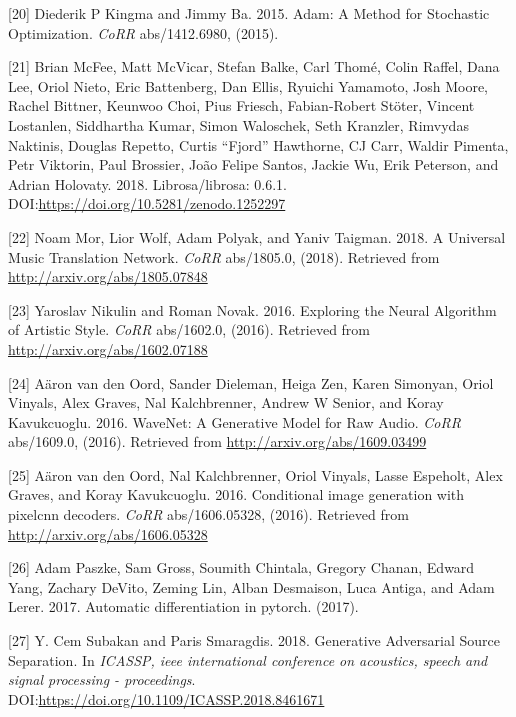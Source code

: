 \documentclass[12pt,a4paper,]{report}
\begin{document}
\leavevmode\hypertarget{ref-Kingma2015AdamAM}{}%
{[}20{]} Diederik P Kingma and Jimmy Ba. 2015. Adam: A Method for
Stochastic Optimization. \emph{CoRR} abs/1412.6980, (2015).

\leavevmode\hypertarget{ref-brian_mcfee_2018_1252297}{}%
{[}21{]} Brian McFee, Matt McVicar, Stefan Balke, Carl Thomé, Colin
Raffel, Dana Lee, Oriol Nieto, Eric Battenberg, Dan Ellis, Ryuichi
Yamamoto, Josh Moore, Rachel Bittner, Keunwoo Choi, Pius Friesch,
Fabian-Robert Stöter, Vincent Lostanlen, Siddhartha Kumar, Simon
Waloschek, Seth Kranzler, Rimvydas Naktinis, Douglas Repetto, Curtis
``Fjord'' Hawthorne, CJ Carr, Waldir Pimenta, Petr Viktorin, Paul
Brossier, João Felipe Santos, Jackie Wu, Erik Peterson, and Adrian
Holovaty. 2018. Librosa/librosa: 0.6.1.
DOI:\url{https://doi.org/10.5281/zenodo.1252297}

\leavevmode\hypertarget{ref-DBLP:journalsux2fcorrux2fabs-1805-07848}{}%
{[}22{]} Noam Mor, Lior Wolf, Adam Polyak, and Yaniv Taigman. 2018. A
Universal Music Translation Network. \emph{CoRR} abs/1805.0, (2018).
Retrieved from \url{http://arxiv.org/abs/1805.07848}

\leavevmode\hypertarget{ref-DBLP:journalsux2fcorrux2fNikulinN16}{}%
{[}23{]} Yaroslav Nikulin and Roman Novak. 2016. Exploring the Neural
Algorithm of Artistic Style. \emph{CoRR} abs/1602.0, (2016). Retrieved
from \url{http://arxiv.org/abs/1602.07188}

\leavevmode\hypertarget{ref-DBLP:journalsux2fcorrux2fOordDZSVGKSK16}{}%
{[}24{]} Aäron van den Oord, Sander Dieleman, Heiga Zen, Karen Simonyan,
Oriol Vinyals, Alex Graves, Nal Kalchbrenner, Andrew W Senior, and Koray
Kavukcuoglu. 2016. WaveNet: A Generative Model for Raw Audio.
\emph{CoRR} abs/1609.0, (2016). Retrieved from
\url{http://arxiv.org/abs/1609.03499}

\leavevmode\hypertarget{ref-DBLP:journalsux2fcorrux2fOordKVEGK16}{}%
{[}25{]} Aäron van den Oord, Nal Kalchbrenner, Oriol Vinyals, Lasse
Espeholt, Alex Graves, and Koray Kavukcuoglu. 2016. Conditional image
generation with pixelcnn decoders. \emph{CoRR} abs/1606.05328, (2016).
Retrieved from \url{http://arxiv.org/abs/1606.05328}

\leavevmode\hypertarget{ref-paszke2017automatic}{}%
{[}26{]} Adam Paszke, Sam Gross, Soumith Chintala, Gregory Chanan,
Edward Yang, Zachary DeVito, Zeming Lin, Alban Desmaison, Luca Antiga,
and Adam Lerer. 2017. Automatic differentiation in pytorch. (2017).

\leavevmode\hypertarget{ref-Subakan2018}{}%
{[}27{]} Y. Cem Subakan and Paris Smaragdis. 2018. Generative
Adversarial Source Separation. In \emph{ICASSP, ieee international
conference on acoustics, speech and signal processing - proceedings}.
DOI:\url{https://doi.org/10.1109/ICASSP.2018.8461671}
\end{document}
